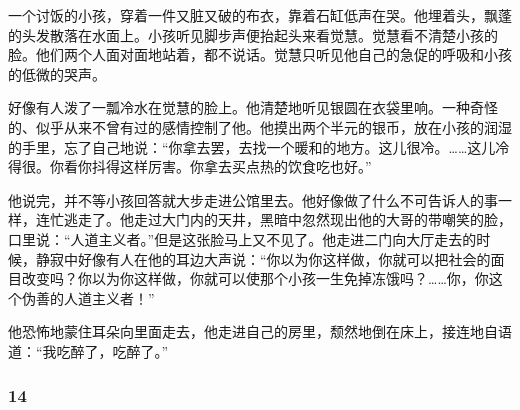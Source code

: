 \par 一个讨饭的小孩，穿着一件又脏又破的布衣，靠着石缸低声在哭。他埋着头，飘蓬的头发散落在水面上。小孩听见脚步声便抬起头来看觉慧。觉慧看不清楚小孩的脸。他们两个人面对面地站着，都不说话。觉慧只听见他自己的急促的呼吸和小孩的低微的哭声。
\par 好像有人泼了一瓢冷水在觉慧的脸上。他清楚地听见银圆在衣袋里响。一种奇怪的、似乎从来不曾有过的感情控制了他。他摸出两个半元的银币，放在小孩的润湿的手里，忘了自己地说：“你拿去罢，去找一个暖和的地方。这儿很冷。……这儿冷得很。你看你抖得这样厉害。你拿去买点热的饮食吃也好。”
\par 他说完，并不等小孩回答就大步走进公馆里去。他好像做了什么不可告诉人的事一样，连忙逃走了。他走过大门内的天井，黑暗中忽然现出他的大哥的带嘲笑的脸，口里说：“人道主义者。”但是这张脸马上又不见了。他走进二门向大厅走去的时候，静寂中好像有人在他的耳边大声说：“你以为你这样做，你就可以把社会的面目改变吗？你以为你这样做，你就可以使那个小孩一生免掉冻饿吗？……你，你这个伪善的人道主义者！”
\par 他恐怖地蒙住耳朵向里面走去，他走进自己的房里，颓然地倒在床上，接连地自语道：“我吃醉了，吃醉了。”


\subsubsection*{14}

